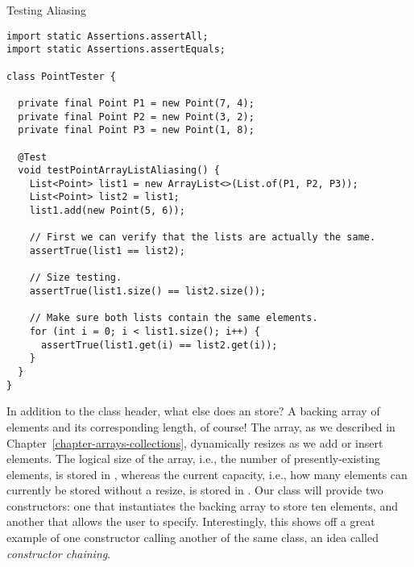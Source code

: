 \begin{cl}[]{Testing  Aliasing}
\begin{lstlisting}[language=MyJava]
import static Assertions.assertAll;
import static Assertions.assertEquals;

class PointTester {

  private final Point P1 = new Point(7, 4);
  private final Point P2 = new Point(3, 2);
  private final Point P3 = new Point(1, 8);

  @Test
  void testPointArrayListAliasing() {
    List<Point> list1 = new ArrayList<>(List.of(P1, P2, P3));
    List<Point> list2 = list1;
    list1.add(new Point(5, 6));

    // First we can verify that the lists are actually the same.
    assertTrue(list1 == list2);

    // Size testing.
    assertTrue(list1.size() == list2.size());

    // Make sure both lists contain the same elements.
    for (int i = 0; i < list1.size(); i++) {
      assertTrue(list1.get(i) == list2.get(i));
    }
  }
}
\end{lstlisting}
\end{cl}


In addition to the class header, what else does an  store? A backing array of elements and its corresponding length, of course! The array, as we described in Chapter~\ref{chapter-arrays-collections}, dynamically resizes as we add or insert elements. The logical size of the array, i.e., the number of presently-existing elements, is stored in , whereas the current capacity, i.e., how many elements can currently be stored without a resize, is stored in . Our class will provide two constructors: one that instantiates the backing array to store ten elements, and another that allows the user to specify. Interestingly, this shows off a great example of one constructor calling another of the same class, an idea called \emph{constructor chaining}. 

